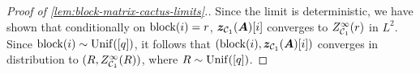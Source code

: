 \begin{proof}[Proof of \cref{lem:block-matrix-cactus-limits}.]
    Since the limit is deterministic, 
    we have shown that
    conditionally on $\operatorname{block}(i)=r$,
    $\bm z_{{\cal C}_1}(\bm A)[i]$ converges
    to $Z^\infty_{{\cal C}_1}(r)$ in $L^2$.
    Since $\operatorname{block}(i)\sim \mathrm{Unif}([q])$, it follows that $(\operatorname{block}(i),\bm z_{{\cal C}_1}(\bm A)[i])$ converges in distribution
    to $(R, Z^\infty_{{\cal C}_1}(R))$, where $R\sim \mathrm{Unif}([q])$.
\end{proof}